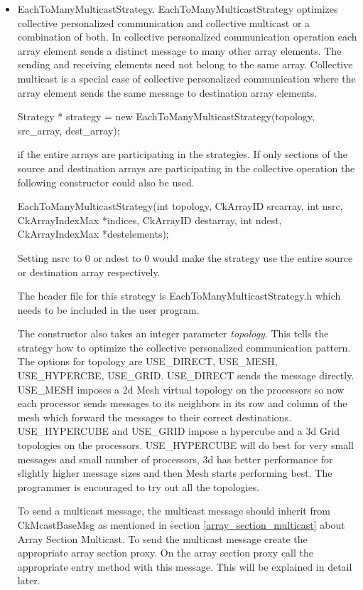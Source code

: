 \begin{itemize} 

\item EachToManyMulticastStrategy. EachToManyMulticastStrategy optimizes 
collective personalized communication and collective multicast or a
combination of both. In collective personalized communication
operation each array element sends a distinct message to many other
array elements. The sending and receiving elements need not belong to
the same array.  Collective multicast is a special case of collective
personalized communication where the array element sends the same
message to destination array elements.

Strategy * strategy = new EachToManyMulticastStrategy(topology,
src\_array, dest\_array);

if the entire arrays are participating in the strategies. If only
sections of the source and destination arrays are participating in the
collective operation the following constructor could also be used.

EachToManyMulticastStrategy(int topology, CkArrayID srcarray, int nsrc, 
CkArrayIndexMax *indices, CkArrayID destarray, int ndest, 
CkArrayIndexMax  *destelements);

Setting nsrc to 0 or ndest to 0 would make the strategy use the entire
source or destination array respectively.

The header file for this strategy is EachToManyMulticastStrategy.h
which needs to be included in the user program.

The constructor also takes an integer parameter {\em topology}. This
tells the strategy how to optimize the collective personalized
communication pattern. The options for topology are USE\_DIRECT,
USE\_MESH, USE\_HYPERCBE, USE\_GRID. USE\_DIRECT sends the message
directly. USE\_MESH imposes a 2d Mesh virtual topology on the
processors so now each processor sends messages to its neighbors in
its row and column of the mesh which forward the messages to their
correct destinations. USE\_HYPERCUBE and USE\_GRID impose a hypercube
and a 3d Grid topologies on the processors. USE\_HYPERCUBE will do
best for very small messages and small number of processors, 3d has
better performance for slightly higher message sizes and then Mesh
starts performing best. The programmer is encouraged to try out all
the topologies.

To send a multicast message, the multicast message should inherit from
CkMcastBaseMsg as mentioned in section \ref{array_section_multicast}
about Array Section Multicast. To send the multicast message create
the appropriate array section proxy. On the array section proxy call
the appropriate entry method with this message. This will be explained
in detail later.


\end{itemize}
